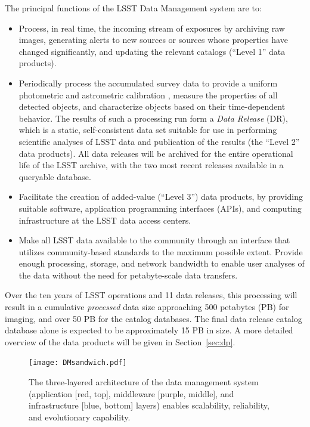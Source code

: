 \documentclass[11pt,twoside]{article}
\begin{document}
The principal functions of the LSST Data Management system \citep{lsstSRD} are to:
\begin{itemize}
\item Process, in real time, the incoming stream of exposures by archiving raw images, generating alerts to new sources or sources whose properties have changed significantly, and updating the relevant catalogs (``Level 1'' data products).
\item Periodically process the accumulated survey data to provide a
  uniform photometric and astrometric calibration \citep[e.g.,][]{LSE-180}, measure the
  properties of all detected objects, and characterize objects based on their time-dependent behavior. The results of such a processing run form a {\em Data Release} (DR), which is a static, self-consistent data set suitable for use in performing scientific analyses of LSST data and publication of the results (the ``Level 2'' data products). All data releases will be archived for the entire operational life of the LSST
archive, with the two most recent releases available in a
queryable database.
\item Facilitate the creation of added-value (``Level 3'') data products, by providing suitable software,
  application programming interfaces (APIs),
and computing infrastructure at the LSST data access centers.
\item Make all LSST data available to the community through an interface that utilizes
community-based standards   to the maximum possible extent. Provide
  enough processing, storage, and network bandwidth to enable user
  analyses of the data without the need for petabyte-scale data
  transfers.
\end{itemize}

Over the ten years of LSST operations and 11 data releases, this processing will result in a cumulative {\em processed} data size
approaching 500 petabytes (PB) for imaging, and over 50 PB for the
catalog databases. The final data release catalog database alone is expected
to be approximately 15 PB in size. A more detailed overview of the data products will be given in
Section~\ref{sec:dp}.
\\

\begin{figure}[!t]
%
%
\begin{center}
\texttt{[image: DMsandwich.pdf]}
\end{center}
\caption{The three-layered architecture of the data management system
(application [red, top], middleware [purple, middle], and infrastructure [blue, bottom] layers) enables scalability, reliability, and evolutionary capability.}
\label{Fig:DM1}
\end{figure}
\end{document}
